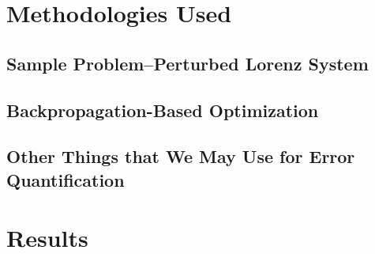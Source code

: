 \documentclass[12pt]{article}
\begin{document}








\section{}



\section{Methodologies Used}

\subsection{Sample Problem\---Perturbed Lorenz System}

\subsection{Backpropagation-Based Optimization}

\subsection{Other Things that We May Use for Error Quantification}



\section{Results}



\nocite{*}

\end{document}
